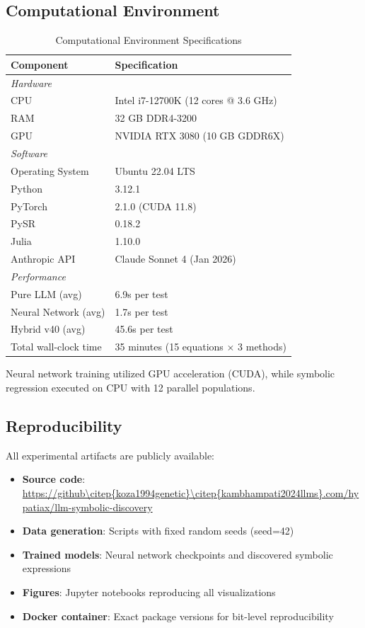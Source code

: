 \documentclass[twoside,11pt]{article}
\begin{document}
\subsection{Computational Environment}

\begin{table}[htbp]
\centering
\caption{Computational Environment Specifications}
\label{tab:environment}
\begin{tabular}{ll}
\toprule
\textbf{Component} & \textbf{Specification} \\
\midrule
\multicolumn{2}{l}{\textit{Hardware}} \\
CPU & Intel i7-12700K (12 cores @ 3.6 GHz) \\
RAM & 32 GB DDR4-3200 \\
GPU & NVIDIA RTX 3080 (10 GB GDDR6X) \\
\midrule
\multicolumn{2}{l}{\textit{Software}} \\
Operating System & Ubuntu 22.04 LTS \\
Python & 3.12.1 \\
PyTorch & 2.1.0 (CUDA 11.8) \\
PySR & 0.18.2 \\
Julia & 1.10.0 \\
Anthropic API & Claude Sonnet 4 (Jan 2026) \\
\midrule
\multicolumn{2}{l}{\textit{Performance}} \\
Pure LLM (avg) & 6\citep{kambhampati2024llms}.9s per test \\
Neural Network (avg) & 1.7s per test \\
Hybrid v40 (avg) & 45.6s per test \\
Total wall-clock time & 35 minutes (15 equations $\times$ 3 methods) \\
\bottomrule
\end{tabular}
\end{table}

Neural network training utilized GPU acceleration (CUDA), while symbolic regression executed on CPU with 12 parallel populations\citep{la2021contemporary}.

\subsection{Reproducibility}

All experimental artifacts are publicly available:

\begin{itemize}
    \item \textbf{Source code}: \url{https://github\citep{koza1994genetic}\citep{kambhampati2024llms}.com/hypatiax/llm-symbolic-discovery}
    \item \textbf{Data generation}: Scripts with fixed random seeds (seed=42)
    \item \textbf{Trained models}: Neural network checkpoints and discovered symbolic expressions
    \item \textbf{Figures}: Jupyter notebooks reproducing all visualizations
    \item \textbf{Docker container}: Exact package versions for bit-level reproducibility
\end{itemize}
\end{document}

